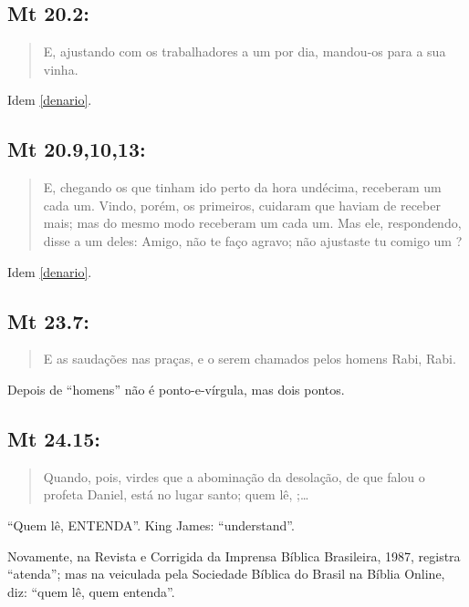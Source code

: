 \subsection*{Mt 20.2:}
\begin{quote} \small E, ajustando com os trabalhadores a um  por dia, man\-dou-os para a sua vinha.\end{quote}
Idem \ref{denario}.


\subsection*{Mt 20.9,10,13:}
\begin{quote}
 \small
 E, chegando os que tinham ido perto da hora undécima, receberam um  cada um. Vindo, porém, os primeiros, cuidaram que haviam de receber mais; mas do mesmo modo receberam um  cada um. Mas ele, respondendo, disse a um deles: Amigo, não te faço agravo; não ajustaste tu comigo um ?
\end{quote}

Idem \ref{denario}.

\subsection*{Mt 23.7:}
\begin{quote}
 \small
 E as saudações nas praças, e o serem chamados pelos homens\uwave{;} Rabi, Rabi.
\end{quote}

Depois de ``homens'' não é ponto-e-vírgula, mas dois pontos.


\subsection*{Mt 24.15:}
\begin{quote}
 \small
Quando, pois, virdes que a abominação da desolação, de
que falou o profeta Daniel, está no lugar santo; quem lê, ;\ldots
\end{quote}

``Quem lê, ENTENDA''. King James: ``understand''.

Novamente, na Revista e Corrigida da Imprensa Bíblica Brasileira, 1987, registra ``atenda''; mas na veiculada pela Sociedade Bíblica do  Brasil na Bíblia Online, diz: ``quem lê, quem entenda''.


